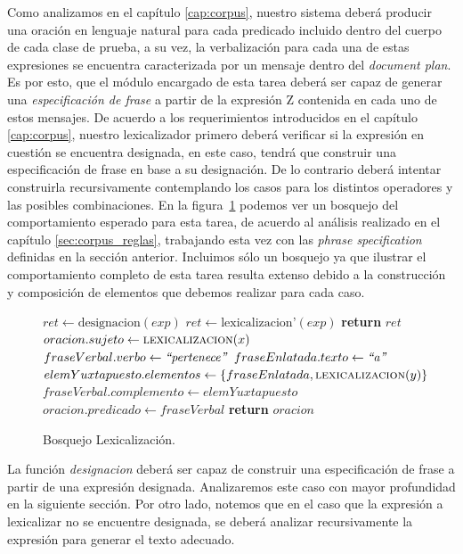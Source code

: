 Como analizamos en el capítulo \ref{cap:corpus}, nuestro sistema deberá producir una oración en lenguaje natural para cada predicado incluido dentro del cuerpo de cada clase de prueba, a su vez, la verbalización para cada una de estas expresiones se encuentra caracterizada por un mensaje dentro del \textit{document plan}. Es por esto, que el módulo encargado de esta tarea deberá ser capaz de generar una \emph{especificación de frase} a partir de la expresión Z contenida en cada uno de estos mensajes. De acuerdo a los requerimientos introducidos en el capítulo \ref{cap:corpus}, nuestro lexicalizador primero deberá verificar si la expresión en cuestión se encuentra designada, en este caso, tendrá que construir una especificación de frase en base a su designación. De lo contrario deberá intentar construirla recursivamente contemplando los casos para los distintos operadores y las posibles combinaciones. En la figura~\ref{fig:algoritmo_lexicalizacion} podemos ver un bosquejo del comportamiento esperado para esta tarea, de acuerdo al análisis realizado en el capítulo \ref{sec:corpus_reglas}, trabajando esta vez con las \emph{phrase specification} definidas en la sección anterior. Incluimos sólo un bosquejo ya que ilustrar el comportamiento completo de esta tarea resulta extenso debido a la construcción y composición de elementos que debemos realizar para cada caso. 

\begin{figure}
\begin{algorithm}[H]
\begin{algorithmic}
\State $ret\gets \text{designacion}(exp)$
\Else
\State $ret\gets \text{lexicalizacion'}(exp)$
\EndIf
\State \textbf{return} $ret$
\EndFunction
\Statex
{}
\State $oracion.sujeto\gets \Call{lexicalizacion}{x}$
\State $fraseVerbal.verbo\gets \text{\textit{``pertenece''}}$
\State $fraseEnlatada.texto\gets \text{\textit{``a''}}$
\State $elemYuxtapuesto.elementos\gets \{fraseEnlatada, \Call{lexicalizacion}{y}\}$
\State $fraseVerbal.complemento\gets elemYuxtapuesto$
\State $oracion.predicado\gets fraseVerbal$
\State \textbf{return} $oracion$
\EndFunction
\end{algorithmic}
\end{algorithm}
\label{fig:algoritmo_lexicalizacion}
\caption{Bosquejo Lexicalización.}
\end{figure}

La función \emph{designacion} deberá ser capaz de construir una especificación de frase a partir de una expresión designada. Analizaremos este caso con mayor profundidad en la siguiente sección. Por otro lado, notemos que en el caso que la expresión a lexicalizar no se encuentre designada, se deberá analizar recursivamente la expresión para generar el texto adecuado. 

